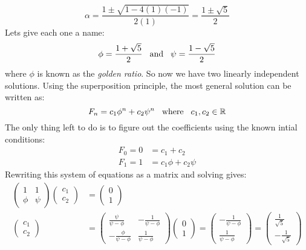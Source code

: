 \documentclass[12pt, letterpaper, onecolumn, conference, final]{IEEEtran}
\theoremstyle{definition}
\theoremstyle{plain}
\begin{document}
\begin{equation*}
\alpha = \frac{1 \pm \sqrt{1 - 4(1)(-1)}}{2(1)} = \frac{1 \pm \sqrt{5}}{2}
\end{equation*}
Lets give each one a name:
\begin{equation*}
\phi = \frac{1 + \sqrt{5}}{2} \hspace{.3cm} \text{and} \hspace{.3cm} \psi = \frac{1 - \sqrt{5}}{2}
\end{equation*}
where $\phi$ is known as the \textit{golden ratio}. So now we have two linearly independent solutions. Using the superposition principle, the most general solution can be written as:
\begin{equation*}
F_n = c_1\phi^n + c_2\psi^n \hspace{.3cm} \text{where} \hspace{.3cm} c_1, c_2 \in \mathbb{R}
\end{equation*}
The only thing left to do is to figure out the coefficients using the known intial conditions:
\begin{equation*}
\begin{split}
F_0 = 0 &= c_1 + c_2 \\
F_1 = 1 &= c_1\phi + c_2\psi
\end{split}
\end{equation*}
Rewriting this system of equations as a matrix and solving gives:
\def\arraystretch{1.5}
\begin{equation*}
\begin{split}
\begin{pmatrix}
1 & 1 \\
\phi & \psi
\end{pmatrix} \begin{pmatrix}
c_1 \\ c_2
\end{pmatrix} &= \begin{pmatrix}
0 \\ 1
\end{pmatrix} \\
\begin{pmatrix}
c_1 \\ c_2
\end{pmatrix} &= \begin{pmatrix}
\frac{\psi}{\psi-\phi} & -\frac{1}{\psi-\phi} \\
-\frac{\phi}{\psi-\phi} & \frac{1}{\psi-\phi}
\end{pmatrix} \begin{pmatrix}
0 \\ 1
\end{pmatrix} = \begin{pmatrix}
-\frac{1}{\psi-\phi} \\ \frac{1}{\psi-\phi} 
\end{pmatrix} = \begin{pmatrix}
\frac{1}{\sqrt{5}} \\ -\frac{1}{\sqrt{5}}
\end{pmatrix}
\end{split}
\end{equation*}
\end{document}
